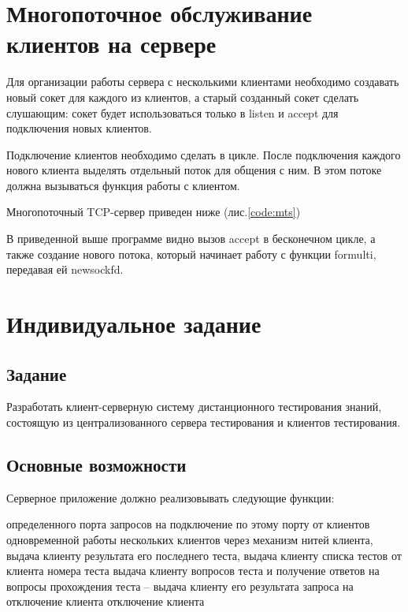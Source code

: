 
\parindent=1cm


\parindent=1cm

\section{Многопоточное обслуживание клиентов на сервере}

Для организации работы сервера с несколькими клиентами необходимо создавать новый сокет для каждого из клиентов, а старый созданный сокет сделать слушающим: сокет будет использоваться только в listen и accept для подключения новых клиентов. 

Подключение клиентов необходимо сделать в цикле. После подключения каждого нового клиента выделять отдельный поток для общения с ним. В этом потоке должна вызываться функция работы с клиентом. 

Многопоточный TCP-сервер приведен ниже (лис.\ref{code:mts})


\parindent=1cm

В приведенной выше программе видно вызов accept в бесконечном цикле, а также создание нового потока, который начинает работу с функции formulti, передавая ей newsockfd. 

\section{Индивидуальное задание}

\subsection{Задание} 

Разработать клиент-серверную систему дистанционного тестирования знаний, состоящую из централизованного сервера тестирования и клиентов тестирования.

\subsection{Основные возможности}

Серверное приложение должно реализовывать следующие функции:
\vspace{5mm}

\begin{enumerate}
 определенного порта
 запросов на подключение по этому порту от клиентов
 одновременной работы нескольких клиентов через механизм нитей
 клиента, выдача клиенту результата его последнего теста, выдача клиенту списка тестов
 от клиента номера теста
 выдача клиенту вопросов теста и получение ответов на вопросы
 прохождения теста – выдача клиенту его результата
 запроса на отключение клиента
 отключение клиента
\end{enumerate}

